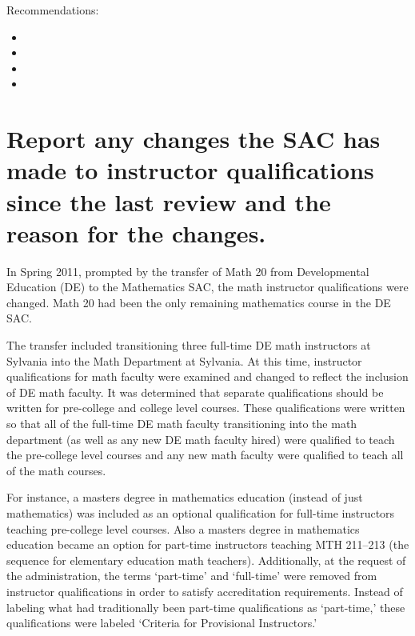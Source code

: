 Recommendations:
\begin{itemize}
  \item {}
  \item {}
\item {}
  \item {}
\end{itemize}
\section{Report any changes the SAC has made to instructor qualifications since
the last review and the reason for the changes.}
In Spring 2011, prompted by the transfer of Math 20 from Developmental
Education (DE) to the Mathematics SAC, the math instructor qualifications were
changed.  Math 20 had been the only remaining mathematics course in the DE SAC.  

The transfer included transitioning three full-time DE math instructors at
Sylvania into the Math Department at Sylvania.  At this time, instructor
qualifications for math faculty were examined and changed to reflect the
inclusion of DE math faculty.  It was determined that separate qualifications
should be written for pre-college and college level courses.  These
qualifications were written so that all of the full-time DE math faculty
transitioning into the math department (as well as any new DE math faculty
hired) were qualified to teach the pre-college level courses and any new math
faculty were qualified to teach all of the math courses.  

For instance, a masters degree in mathematics education (instead of just
mathematics) was included as an optional qualification for full-time
instructors teaching pre-college level courses.  Also a masters degree in
mathematics education became an option for part-time instructors teaching MTH
211--213 (the sequence for elementary education math teachers).  Additionally,
at the request of the administration, the terms `part-time' and `full-time'
were removed from instructor qualifications in order to satisfy accreditation
requirements.  Instead of labeling what had traditionally been part-time
qualifications as `part-time,' these qualifications were labeled `Criteria for
Provisional Instructors.'

